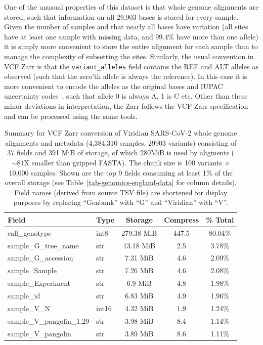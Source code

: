 \documentclass[a4paper,num-refs]{oup-contemporary}
\begin{document}
One of the unusual properties of this dataset is that whole genome alignments
are stored, such that information on all 29,903 bases is stored for every
sample. Given the number of samples and that nearly all bases have 
variation (all sites have at least one sample with missing data,
and 99.4\% have more than one allele)
it is simply more convenient to
store the entire alignment for each sample than to manage the complexity
of subsetting the sites. Similarly, the usual convention in VCF Zarr
is that the \texttt{variant\_alleles} field contains the REF and ALT
alleles as observed (such that the zero'th allele is always the reference).
In this case it is more convenient to encode the alleles as the original
bases and IUPAC uncertainty codes~\citep{cornish1985nomenclature}, 
such that allele 0 is always A, 1 is C etc.
Other than these minor deviations in interpretation, the Zarr follows
the VCF Zarr specification and can be processed using the same tools.

\begin{table}
\caption{Summary for VCF Zarr conversion of Viridian SARS-CoV-2
whole genome alignments and metadata 
(4,384,310 samples, 29903 variants)
consisting of 37 fields and 391 MiB of storage, 
of which 280MiB is used by aligments ($\sim 81$X smaller 
than gzipped FASTA). The chunk size is 100 variants $\times$
10,000 samples.
Shown are the top 9 fields consuming at least 1\% of the 
overall storage (see Table~\ref{tab-genomics-england-data} for column details).
Field names (derived from source TSV file) are shortened for 
display purposes by replacing ``Genbank'' with ``G''
and ``Viridian'' with ``V''.
\label{tab-sc2-data}}
\begin{tabular}{llS[table-format=3.2]S[table-format=3.2]S[table-format=3.2]}
\toprule
{Field} & {Type} & {Storage} & {Compress} & {\% Total} \\
\midrule
call\_genotype & int8 & 279.38 MiB & 447.5 & 80.04\% \\
sample\_G\_tree\_name & str & 13.18 MiB & 2.5 & 3.78\% \\
sample\_G\_accession & str & 7.31 MiB & 4.6 & 2.09\% \\
sample\_Sample & str & 7.26 MiB & 4.6 & 2.08\% \\
sample\_Experiment & str & 6.9 MiB & 4.8 & 1.98\% \\
sample\_id & str & 6.83 MiB & 4.9 & 1.96\% \\
sample\_V\_N & int16 & 4.32 MiB & 1.9 & 1.24\% \\
sample\_V\_pangolin\_1.29 & str & 3.98 MiB & 8.4 & 1.14\% \\
sample\_V\_pangolin & str & 3.89 MiB & 8.6 & 1.11\% \\
\bottomrule
\end{tabular}
\end{table}
\end{document}

